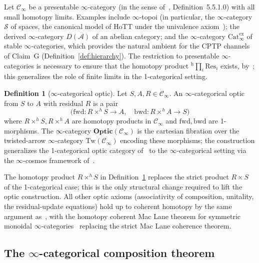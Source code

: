 \documentclass[11pt,a4paper]{article}
\theoremstyle{plain}
\theoremstyle{definition}
\newtheorem{definition}[theorem]{Definition}
\theoremstyle{remark}
\newcommand{\Optic}{\mathbf{Optic}}
\begin{document}
Let $\mathcal{C}_\infty$ be a presentable $\infty$-category (in the
sense of~\cite{lurie2009htt}, Definition~5.5.1.0) with all small
homotopy limits. Examples include $\infty$-topoi (in particular, the
$\infty$-category $\mathcal{S}$ of spaces, the canonical model of HoTT
under the univalence axiom~\cite{hottbook2013}); the derived
$\infty$-category $D(\mathcal{A})$ of an abelian category; and the
$\infty$-category $\mathrm{Cat}^{\mathrm{ex}}_\infty$ of stable
$\infty$-categories, which provides the natural ambient for the CPTP
channels of Claim~G (Definition~\ref{def:hierarchy}). The restriction to
presentable $\infty$-categories is necessary to ensure that the
homotopy product ${}^{\mathrm{h}}\!\prod_i \mathrm{Res}_i$ exists, by~\cite[Proposition
5.5.3.1]{lurie2009htt}; this generalizes the role of finite limits in
the 1-categorical setting.

\begin{definition}[$\infty$-categorical optic]
\label{def:hott-optic}
Let $S, A, R \in \mathcal{C}_\infty$. An $\infty$-categorical optic
from $S$ to $A$ with residual $R$ is a pair
\[
\bigl(\mathrm{fwd}: R \times^h S \to A, \quad
      \mathrm{bwd}: R \times^h A \to S\bigr)
\]
where $R \times^h S, R \times^h A$ are homotopy products in
$\mathcal{C}_\infty$ and $\mathrm{fwd}, \mathrm{bwd}$ are 1-morphisms.
The $\infty$-category $\Optic(\mathcal{C}_\infty)$ is the cartesian
fibration over the twisted-arrow $\infty$-category
$\mathrm{Tw}(\mathcal{C}_\infty)$ encoding these morphisms; the
construction generalizes the 1-categorical optic category
of~\cite{riley2018optics} to the $\infty$-categorical setting via the
$\infty$-cosmos framework of~\cite{riehlverity2022}.
\end{definition}

The homotopy product $R \times^h S$ in
Definition~\ref{def:hott-optic} replaces the strict product $R \times S$
of the 1-categorical case; this is the only structural change required
to lift the optic construction. All other optic axioms (associativity of
composition, unitality, the residual-update equations) hold up to
coherent homotopy by the same argument as~\cite[Proposition~2.3]
{riley2018optics}, with the homotopy coherent Mac Lane theorem for
symmetric monoidal $\infty$-categories~\cite[Theorem~2.4.3]
{lurie2017ha} replacing the strict Mac Lane coherence theorem.

\subsection{The $\infty$-categorical composition theorem}
\end{document}

